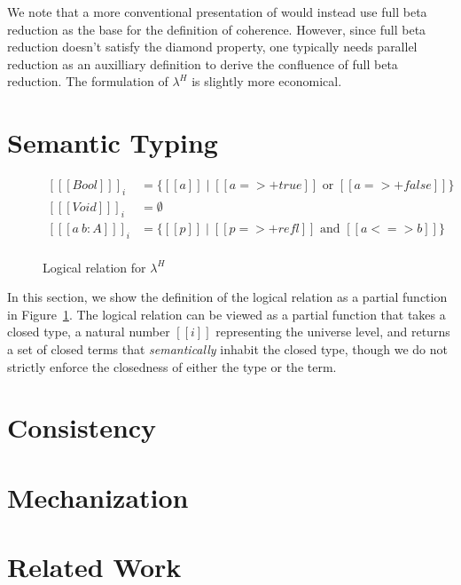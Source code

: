 \documentclass[nonacm]{acmart}
\newcommand{\lang}{$\lambda^H$\xspace}
\begin{document}
We note that a more conventional presentation of
 would instead use full beta reduction as the base for
the definition of coherence. However, since full beta reduction
doesn't satisfy the diamond property, one typically needs parallel
reduction as an auxilliary definition to derive the confluence of full
beta reduction. The formulation of \lang is slightly more economical.

\section{Semantic Typing}
\label{sec:logreldep}
\begin{figure}[h]
  \begin{equation*}
    \begin{split}
      [ [[Bool]] ]_i &= \{ [[a]] \mid [[a =>+ true]] \text{ or } [[a =>+ false]] \} \\
      [ [[Void]] ]_i &= \emptyset \\
      [ [[a ~ b : A]] ]_i &= \{ [[p]] \mid [[p =>+ refl]] \text { and } [[a<=>b]] \}\\
    \end{split}
  \end{equation*}
  \caption{Logical relation for \lang}
  \label{fig:logrel}
\end{figure}


In this section, we show the definition of the logical relation as a
partial function in Figure~\ref{fig:logrel}. The logical relation can
be viewed as a partial function that takes a closed type,
a natural number $[[i]]$ representing the universe level, and
returns a set of closed terms that \emph{semantically} inhabit the
closed type, though we do not strictly enforce the closedness of
either the type or the term.

\section{Consistency}
\label{sec:logrelproof}

\section{Mechanization}
\label{sec:logrelmech}

\section{Related Work}
\label{sec:relatedwork}
\end{document}
